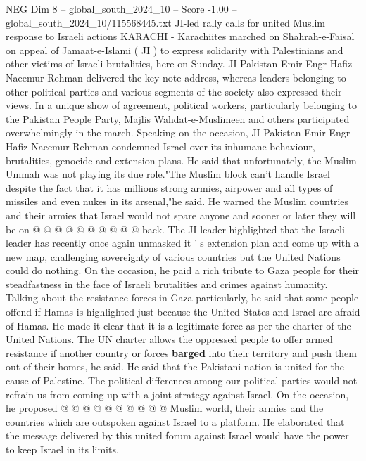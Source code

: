 \begin{textsample}{NEG Dim 8 – global\_south\_2024\_10 – Score -1.00 – global\_south\_2024\_10/115568445.txt}  \label{ex:f8_neg_146}
JI-led rally calls for united Muslim response to Israeli actions KARACHI - Karachiites marched on Shahrah-e-Faisal on appeal of Jamaat-e-Islami ( JI ) to express solidarity with Palestinians and other victims of Israeli brutalities, here on Sunday.
JI Pakistan Emir Engr Hafiz Naeemur Rehman delivered the key note address, whereas leaders belonging to other political parties and various segments of the society also expressed their views.
In a unique show of agreement, political workers, particularly belonging to the Pakistan People Party, Majlis Wahdat-e-Muslimeen and others participated overwhelmingly in the march.
Speaking on the occasion, JI Pakistan Emir Engr Hafiz Naeemur Rehman condemned Israel over its inhumane behaviour, brutalities, genocide and extension plans.
He said that unfortunately, the Muslim Ummah was not playing its due role."The Muslim block can't handle Israel despite the fact that it has millions strong armies, airpower and all types of missiles and even nukes in its arsenal,"he said.
He warned the Muslim countries and their armies that Israel would not spare anyone and sooner or later they will be on @ @ @ @ @ @ @ @ @ @ back.
The JI leader highlighted that the Israeli leader has recently once again unmasked it ' s extension plan and come up with a new map, challenging sovereignty of various countries but the United Nations could do nothing.
On the occasion, he paid a rich tribute to Gaza people for their steadfastness in the face of Israeli brutalities and crimes against humanity.
Talking about the resistance forces in Gaza particularly, he said that some people offend if Hamas is highlighted just because the United States and Israel are afraid of Hamas.
He made it clear that it is a legitimate force as per the charter of the United Nations.
The UN charter allows the oppressed people to offer armed resistance if another country or forces \textbf{barged} into their territory and push them out of their homes, he said.
He said that the Pakistani nation is united for the cause of Palestine.
The political differences among our political parties would not refrain us from coming up with a joint strategy against Israel.
On the occasion, he proposed @ @ @ @ @ @ @ @ @ @ Muslim world, their armies and the countries which are outspoken against Israel to a platform.
He elaborated that the message delivered by this united forum against Israel would have the power to keep Israel in its limits.

\end{textsample}
